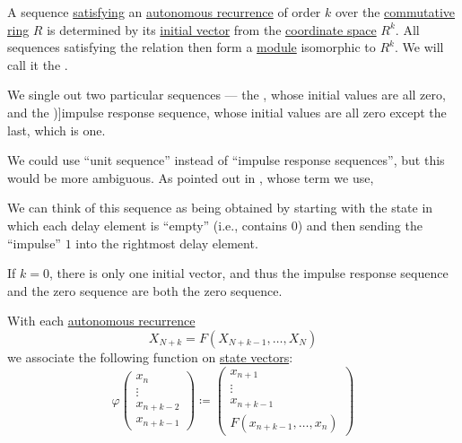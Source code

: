 \begin{definition}\label{def:recurrence_relation_space}\mimprovised
  A sequence \hyperref[def:recurrence_relation/sequence]{satisfying} an \hyperref[def:recurrence_relation]{autonomous recurrence} of order \( k \) over the \hyperref[def:ring/commutative]{commutative ring} \( R \) is determined by its \hyperref[def:recurrence_relation/state]{initial vector} from the \hyperref[def:coordinate_space]{coordinate space} \( R^k \). All sequences satisfying the relation then form a \hyperref[def:module]{module} isomorphic to \( R^k \). We will call it the .

  We single out two particular sequences --- the , whose initial values are all zero, and the \term[en=impulse response sequence (\cite[402]{LidlNiederreiter1997FiniteFields})]{impulse response sequence}, whose initial values are all zero except the last, which is one.
\end{definition}
\begin{comments}
  \item We could use \enquote{unit sequence} instead of \enquote{impulse response sequences}, but this would be more ambiguous. As pointed out in , whose term we use,
  \begin{displayquote}
    We can think of this sequence as being obtained by starting with the state in which each delay element is \enquote{empty} (i.e., contains
\( 0 \)) and then sending the \enquote{impulse} \( 1 \) into the rightmost delay element.
  \end{displayquote}

  \item If \( k = 0 \), there is only one initial vector, and thus the impulse response sequence and the zero sequence are both the zero sequence.
\end{comments}

\begin{definition}\label{def:autonomous_recurrence_associated_function}\mimprovised
  With each \hyperref[def:recurrence_relation/autonomous]{autonomous recurrence}
  \begin{equation*}
    X_{N+k} = F(X_{N+k-1}, \ldots, X_N)
  \end{equation*}
  we associate the following function on \hyperref[def:recurrence_relation/state]{state vectors}:
  \begin{equation}\label{eq:def:autonomous_recurrence_associated_function}
    \varphi
    \begin{pmatrix}
      x_n \\
      \vdots \\
      x_{n+k-2} \\
      x_{n+k-1}
    \end{pmatrix}
    \coloneqq
    \begin{pmatrix}
      x_{n+1} \\
      \vdots \\
      x_{n+k-1} \\
      F(x_{n+k-1}, \ldots, x_n)
    \end{pmatrix}
  \end{equation}
\end{definition}

